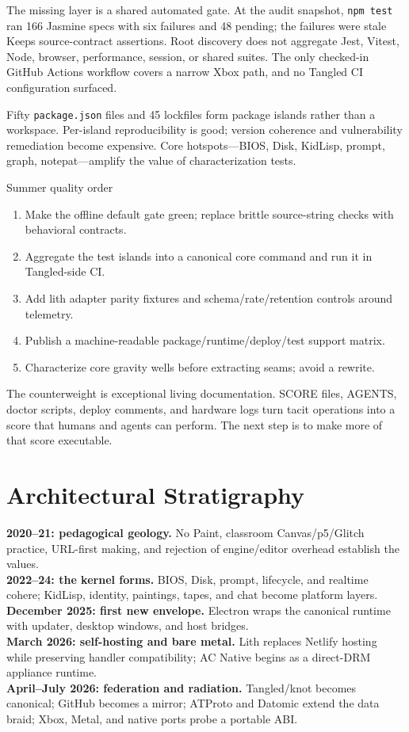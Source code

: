 \documentclass[10pt,letterpaper,twocolumn]{article}
\begin{document}
The missing layer is a shared automated gate. At the audit snapshot, \texttt{npm test} ran 166 Jasmine specs with six failures and 48 pending; the failures were stale Keeps source-contract assertions. Root discovery does not aggregate Jest, Vitest, Node, browser, performance, session, or shared suites. The only checked-in GitHub Actions workflow covers a narrow Xbox path, and no Tangled CI configuration surfaced.

Fifty \texttt{package.json} files and 45 lockfiles form package islands rather than a workspace. Per-island reproducibility is good; version coherence and vulnerability remediation become expensive. Core hotspots---BIOS, Disk, KidLisp, prompt, graph, notepat---amplify the value of characterization tests.

\begin{stackfinding}{Summer quality order}
\begin{enumerate}
\item Make the offline default gate green; replace brittle source-string checks with behavioral contracts.
\item Aggregate the test islands into a canonical core command and run it in Tangled-side CI.
\item Add lith adapter parity fixtures and schema/rate/retention controls around telemetry.
\item Publish a machine-readable package/runtime/deploy/test support matrix.
\item Characterize core gravity wells before extracting seams; avoid a rewrite.
\end{enumerate}
\end{stackfinding}

The counterweight is exceptional living documentation. SCORE files, AGENTS, doctor scripts, deploy comments, and hardware logs turn tacit operations into a score that humans and agents can perform. The next step is to make more of that score executable.

\section{Architectural Stratigraphy}

\textbf{2020--21: pedagogical geology.} No Paint, classroom Canvas/p5/Glitch practice, URL-first making, and rejection of engine/editor overhead establish the values.\\
\textbf{2022--24: the kernel forms.} BIOS, Disk, prompt, lifecycle, and realtime cohere; KidLisp, identity, paintings, tapes, and chat become platform layers.\\
\textbf{December 2025: first new envelope.} Electron wraps the canonical runtime with updater, desktop windows, and host bridges.\\
\textbf{March 2026: self-hosting and bare metal.} Lith replaces Netlify hosting while preserving handler compatibility; AC Native begins as a direct-DRM appliance runtime.\\
\textbf{April--July 2026: federation and radiation.} Tangled/knot becomes canonical; GitHub becomes a mirror; ATProto and Datomic extend the data braid; Xbox, Metal, and native ports probe a portable ABI.
\end{document}
